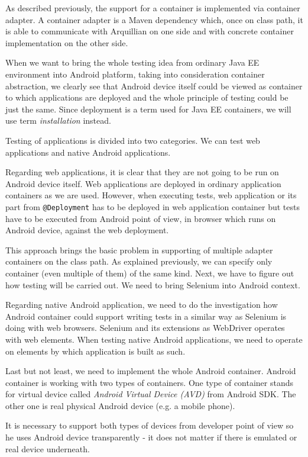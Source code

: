 \documentclass[12pt,final,oneside]{fithesis}
\begin{document}
As described previously, the support for a container is implemented via container adapter. A container adapter is a Maven dependency which, once on class path, it is able to communicate with Arquillian on one side and with concrete container implementation on the other side.

When we want to bring the whole testing idea from ordinary Java EE environment into Android platform, taking into consideration container abstraction, we clearly see that Android device itself could be viewed as container to which applications are deployed and the whole principle of testing could be just the same. Since deployment is a term used for Java EE containers, we will use term \textit{installation} instead.

Testing of applications is divided into two categories. We can test web applications and native Android applications.

Regarding web applications, it is clear that they are not going to be run on Android device itself. Web applications are deployed in ordinary application containers as we are used. However, when executing tests, web application or its part from \texttt{@Deployment} has to be deployed in web application container but tests have to be executed from Android point of view, in browser which runs on Android device, against the web deployment.

This approach brings the basic problem in supporting of multiple adapter containers on the class path. As explained previously, we can specify only container (even multiple of them) of the same kind. Next, we have to figure out how testing will be carried out. We need to bring Selenium into Android context.

Regarding native Android application, we need to do the investigation how Android container could support writing tests in a similar way as Selenium is doing with web browsers. Selenium and its extensions as WebDriver operates with web elements. When testing native Android applications, we need to operate on elements by which application is built as such.

Last but not least, we need to implement the whole Android container. Android container is working with two types of containers. One type of container stands for virtual device called \textit{Android Virtual Device (AVD)} from Android SDK. The other one is real physical Android device (e.g. a mobile phone).

It is necessary to support both types of devices from developer point of view so he uses Android device transparently - it does not matter if there is emulated or real device underneath. 
\end{document}
